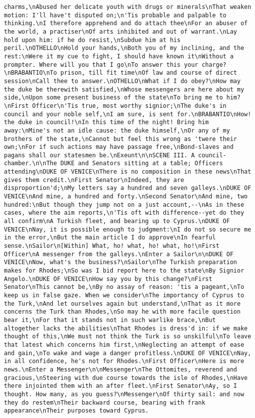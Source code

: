 \begin{verbatim}
charms,\nAbused her delicate youth with drugs or minerals\nThat weaken motion: I'll have't disputed on;\n'Tis probable and palpable to thinking.\nI therefore apprehend and do attach thee\nFor an abuser of the world, a practiser\nOf arts inhibited and out of warrant.\nLay hold upon him: if he do resist,\nSubdue him at his peril.\nOTHELLO\nHold your hands,\nBoth you of my inclining, and the rest:\nWere it my cue to fight, I should have known it\nWithout a prompter. Where will you that I go\nTo answer this your charge?\nBRABANTIO\nTo prison, till fit time\nOf law and course of direct session\nCall thee to answer.\nOTHELLO\nWhat if I do obey?\nHow may the duke be therewith satisfied,\nWhose messengers are here about my side,\nUpon some present business of the state\nTo bring me to him?\nFirst Officer\n'Tis true, most worthy signior;\nThe duke's in council and your noble self,\nI am sure, is sent for.\nBRABANTIO\nHow! the duke in council!\nIn this time of the night! Bring him away:\nMine's not an idle cause: the duke himself,\nOr any of my brothers of the state,\nCannot but feel this wrong as 'twere their own;\nFor if such actions may have passage free,\nBond-slaves and pagans shall our statesmen be.\nExeunt\n\nSCENE III. A council-chamber.\n\nThe DUKE and Senators sitting at a table; Officers attending\nDUKE OF VENICE\nThere is no composition in these news\nThat gives them credit.\nFirst Senator\nIndeed, they are disproportion'd;\nMy letters say a hundred and seven galleys.\nDUKE OF VENICE\nAnd mine, a hundred and forty.\nSecond Senator\nAnd mine, two hundred:\nBut though they jump not on a just account,--\nAs in these cases, where the aim reports,\n'Tis oft with difference--yet do they all confirm\nA Turkish fleet, and bearing up to Cyprus.\nDUKE OF VENICE\nNay, it is possible enough to judgment:\nI do not so secure me in the error,\nBut the main article I do approve\nIn fearful sense.\nSailor\n[Within] What, ho! what, ho! what, ho!\nFirst Officer\nA messenger from the galleys.\nEnter a Sailor\n\nDUKE OF VENICE\nNow, what's the business?\nSailor\nThe Turkish preparation makes for Rhodes;\nSo was I bid report here to the state\nBy Signior Angelo.\nDUKE OF VENICE\nHow say you by this change?\nFirst Senator\nThis cannot be,\nBy no assay of reason: 'tis a pageant,\nTo keep us in false gaze. When we consider\nThe importancy of Cyprus to the Turk,\nAnd let ourselves again but understand,\nThat as it more concerns the Turk than Rhodes,\nSo may he with more facile question bear it,\nFor that it stands not in such warlike brace,\nBut altogether lacks the abilities\nThat Rhodes is dress'd in: if we make thought of this,\nWe must not think the Turk is so unskilful\nTo leave that latest which concerns him first,\nNeglecting an attempt of ease and gain,\nTo wake and wage a danger profitless.\nDUKE OF VENICE\nNay, in all confidence, he's not for Rhodes.\nFirst Officer\nHere is more news.\nEnter a Messenger\n\nMessenger\nThe Ottomites, reverend and gracious,\nSteering with due course towards the isle of Rhodes,\nHave there injointed them with an after fleet.\nFirst Senator\nAy, so I thought. How many, as you guess?\nMessenger\nOf thirty sail: and now they do restem\nTheir backward course, bearing with frank appearance\nTheir purposes toward Cyprus. 
\end{verbatim}
